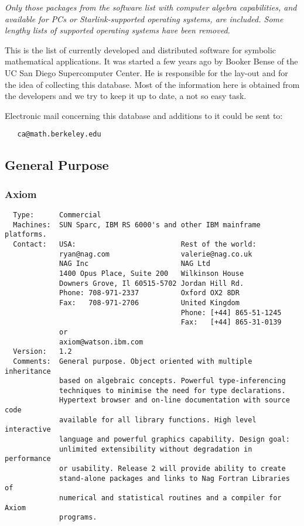\documentclass[twoside,11pt]{article}
\begin{document}
{\sl Only those packages from the software list with computer algebra
capabilities, and available for PCs or Starlink-supported operating
systems, are included.  Some lengthy lists of supported operating systems
have been removed.}

This is the  list of  currently  developed  and   distributed   software  for
symbolic mathematical applications. It was started a few years ago by  Booker
Bense of the UC San Diego Supercomputer Center. He is responsible for     the
lay-out and for the idea of collecting this database. Most of the information
here is obtained from the developers and we try to keep it up to date, a  not
so easy task.

Electronic mail concerning this database and additions to it could be
sent to:

\begin{verbatim}
   ca@math.berkeley.edu
\end{verbatim}

\subsection{General Purpose}

\subsubsection{Axiom}
\begin{verbatim}
  Type:      Commercial
  Machines:  SUN Sparc, IBM RS 6000's and other IBM mainframe platforms.
  Contact:   USA:                         Rest of the world:
             ryan@nag.com                 valerie@nag.co.uk
             NAG Inc                      NAG Ltd
             1400 Opus Place, Suite 200   Wilkinson House
             Downers Grove, Il 60515-5702 Jordan Hill Rd.
             Phone: 708-971-2337          Oxford OX2 8DR
             Fax:   708-971-2706          United Kingdom
                                          Phone: [+44] 865-51-1245
                                          Fax:   [+44] 865-31-0139
             or
             axiom@watson.ibm.com
  Version:   1.2
  Comments:  General purpose. Object oriented with multiple inheritance
             based on algebraic concepts. Powerful type-inferencing
             techniques to minimise the need for type declarations.
             Hypertext browser and on-line documentation with source code
             available for all library functions. High level interactive
             language and powerful graphics capability. Design goal:
             unlimited extensibility without degradation in performance
             or usability. Release 2 will provide ability to create
             stand-alone packages and links to Nag Fortran Libraries of
             numerical and statistical routines and a compiler for Axiom
             programs.
\end{verbatim}
\end{document}
